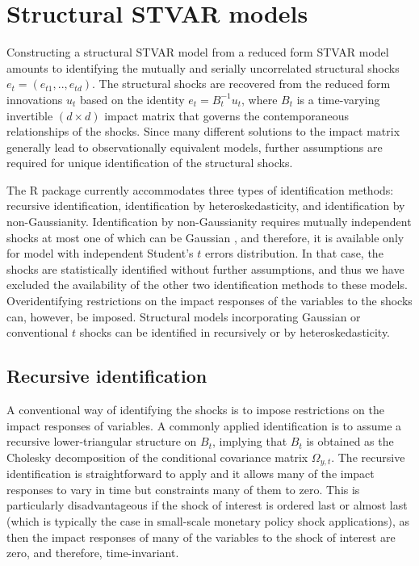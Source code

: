 \documentclass[nojss]{jss}
\begin{document}
\section{Structural STVAR models}\label{sec:struct_stvar}
Constructing a structural STVAR model from a reduced form STVAR model amounts to identifying the mutually and serially uncorrelated structural shocks $e_t=(e_{t1},..,e_{td})$. The structural shocks are recovered from the reduced form innovations $u_t$ based on the identity $e_t=B_t^{-1}u_t$, where $B_t$ is a time-varying invertible $(d\times d)$ impact matrix that governs the contemporaneous relationships of the shocks.  Since many different solutions to the impact matrix generally lead to observationally equivalent models, further assumptions are required for unique identification of the structural shocks.

The R package  currently accommodates three types of identification methods: recursive identification, identification by heteroskedasticity, and identification by non-Gaussianity. Identification by non-Gaussianity requires mutually independent shocks at most one of which can be Gaussian \citep{Virolainen2:2024}, and therefore, it is available only for model with independent Student's $t$ errors distribution. In that case, the shocks are statistically identified without further assumptions, and thus we have excluded the availability of the other two identification methods to these models. Overidentifying restrictions on the impact responses of the variables to the shocks can, however, be imposed. Structural models incorporating Gaussian or conventional $t$ shocks can be identified in  recursively or by heteroskedasticity.

\subsection{Recursive identification}
A conventional way of identifying the shocks is to impose restrictions on the impact responses of variables. A commonly applied identification is to assume a recursive lower-triangular structure on $B_t$, implying that $B_t$ is obtained as the Cholesky decomposition of the conditional covariance matrix $\Omega_{y,t}$. The recursive identification is straightforward to apply and it allows many of the impact responses to vary in time but constraints many of them to zero. This is particularly disadvantageous if the shock of interest is ordered last or almost last (which is typically the case in small-scale monetary policy shock applications), as then the impact responses of many of the variables to the shock of interest are zero, and therefore, time-invariant.
\end{document}
